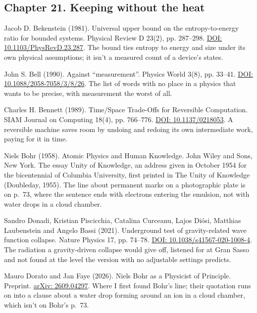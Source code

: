 \subsection*{Chapter 21. Keeping without the heat}

\noindent Jacob D. Bekenstein (1981). Universal upper bound on the entropy-to-energy ratio for bounded systems. Physical Review D 23(2), pp. 287--298. \href{https://doi.org/10.1103/PhysRevD.23.287}{DOI: 10.1103/PhysRevD.23.287}. The bound ties entropy to energy and size under its own physical assumptions; it isn't a measured count of a device's states.
\par\medskip

\noindent John S. Bell (1990). Against ``measurement''. Physics World 3(8), pp. 33--41. \href{https://doi.org/10.1088/2058-7058/3/8/26}{DOI: 10.1088/2058-7058/3/8/26}. The list of words with no place in a physics that wants to be precise, with measurement the worst of all.
\par\medskip

\noindent Charles H. Bennett (1989). Time/Space Trade-Offs for Reversible Computation. SIAM Journal on Computing 18(4), pp. 766--776. \href{https://doi.org/10.1137/0218053}{DOI: 10.1137/0218053}. A reversible machine saves room by undoing and redoing its own intermediate work, paying for it in time.
\par\medskip

\noindent Niels Bohr (1958). Atomic Physics and Human Knowledge. John Wiley and Sons, New York. The essay Unity of Knowledge, an address given in October 1954 for the bicentennial of Columbia University, first printed in The Unity of Knowledge (Doubleday, 1955). The line about permanent marks on a photographic plate is on p.~73, where the sentence ends with electrons entering the emulsion, not with water drops in a cloud chamber.
\par\medskip

\noindent Sandro Donadi, Kristian Piscicchia, Catalina Curceanu, Lajos Di\'osi, Matthias Laubenstein and Angelo Bassi (2021). Underground test of gravity-related wave function collapse. Nature Physics 17, pp. 74--78. \href{https://doi.org/10.1038/s41567-020-1008-4}{DOI: 10.1038/s41567-020-1008-4}. The radiation a gravity-driven collapse would give off, listened for at Gran Sasso and not found at the level the version with no adjustable settings predicts.
\par\medskip

\noindent Mauro Dorato and Jan Faye (2026). Niels Bohr as a Physicist of Principle. Preprint. \href{https://arxiv.org/abs/2609.04297}{arXiv: 2609.04297}. Where I first found Bohr's line; their quotation runs on into a clause about a water drop forming around an ion in a cloud chamber, which isn't on Bohr's p.~73.
\par\medskip

